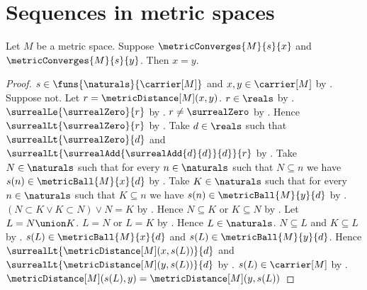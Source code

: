 



\section{Sequences in metric spaces}

\begin{theorem}\label{metric_limit_unique}
    Let $M$ be a metric space.
    Suppose $\metricConverges{M}{s}{x}$ and
        $\metricConverges{M}{s}{y}$.
    Then $x=y$.
\end{theorem}
\begin{proof}
    $s\in\funs{\naturals}{\carrier[M]}$ and
        $x,y\in\carrier[M]$ by .
    Suppose not.
        Let $r=\metricDistance[M](x,y)$.
        $r\in\reals$ by .
        $\surrealLe{\surrealZero}{r}$
            by .
        $r\neq\surrealZero$ by .
        Hence $\surrealLt{\surrealZero}{r}$
            by .
        Take $d\in\reals$ such that $\surrealLt{\surrealZero}{d}$ and
            $\surrealLt{\surrealAdd{\surrealAdd{d}{d}}{d}}{r}$
            by .
        Take $N\in\naturals$ such that for every $n\in\naturals$
            such that $N\subseteq n$ we have
                $s(n)\in\metricBall{M}{x}{d}$
            by .
        Take $K\in\naturals$ such that for every $n\in\naturals$
            such that $K\subseteq n$ we have
                $s(n)\in\metricBall{M}{y}{d}$
            by .
        $(N\subset K\lor K\subset N)\lor N=K$
            by
            .
        Hence $N\subseteq K$ or $K\subseteq N$
            by .
        Let $L=N\union K$.
        $L=N$ or $L=K$
            by
            .
        Hence $L\in\naturals$.
        $N\subseteq L$ and $K\subseteq L$
            by .
        $s(L)\in\metricBall{M}{x}{d}$ and
            $s(L)\in\metricBall{M}{y}{d}$.
        Hence
            $\surrealLt{\metricDistance[M](x,s(L))}{d}$ and
            $\surrealLt{\metricDistance[M](y,s(L))}{d}$
            by .
        $s(L)\in\carrier[M]$ by .
        $\metricDistance[M](s(L),y)=\metricDistance[M](y,s(L))$

\end{proof}
